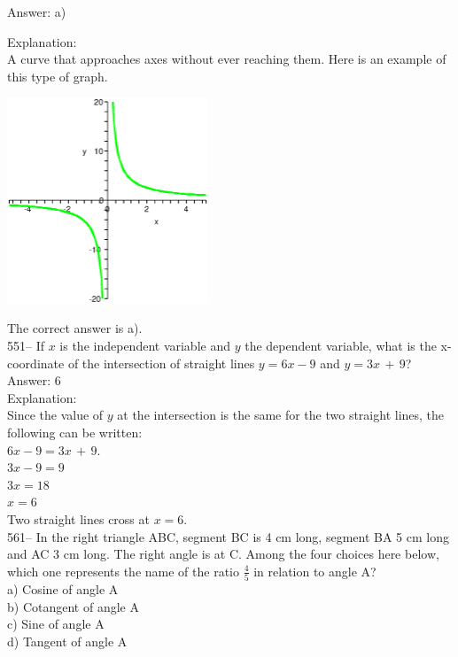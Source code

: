 \documentclass[letterpaper, 12pt]{article}
\begin{document}
Answer: a)

Explanation: \\
A curve that approaches axes without ever reaching them.
Here is an example of this type of graph.\\
    \begin{center}
    \includegraphics[width=6cm,bb=0 0 400 400]{fonction16.eps}
    \end{center}

The correct answer is a).\\



551-- If $x$ is the independent variable and $y$ the dependent variable,
what is the x-coordinate of the intersection of straight lines $y=6x-9$ and $y=3x\,+\,9$?\\

Answer: 6\\

Explanation: \\
Since the value of $y$ at the intersection is the same for the two straight lines, the following can be written: \\
$6x-9=3x\,+\,9$.\\
$3x-9=9$\\
$3x=18$\\
$x=6$\\
Two straight lines cross at $x=6$.\\



561-- In the right triangle ABC, segment BC is 4 cm long, segment BA 5 cm long and AC 3 cm long. The right angle is at C. Among the four choices here below, which one represents the name of the ratio $\frac{4}{5}$ in relation to angle A?\\

a) Cosine of angle A\\
b) Cotangent of angle A\\
c) Sine of angle A\\
d) Tangent of angle A\\
\end{document}
